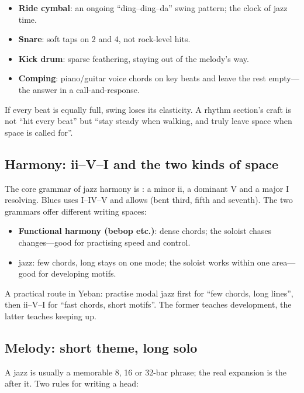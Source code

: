 \begin{itemize}
\item \textbf{Ride cymbal}: an ongoing ``ding--ding--da'' swing pattern; the clock of jazz time.
\item \textbf{Snare}: soft taps on 2 and 4, not rock-level hits.
\item \textbf{Kick drum}: sparse feathering, staying out of the melody's way.
\item \textbf{Comping}: piano/guitar voice chords on key beats and leave the rest empty---the answer in a call-and-response.
\end{itemize}

If every beat is equally full, swing loses its elasticity. A rhythm section's craft is not ``hit every beat'' but ``stay steady when walking, and truly leave space when space is called for''.

\subsection{Harmony: ii--V--I and the two kinds of space}
\label{sec:jazz-harmony}

The core grammar of jazz harmony is : a minor ii, a dominant V and a major I resolving. Blues uses I--IV--V and allows  (bent third, fifth and seventh). The two grammars offer different writing spaces:

\begin{itemize}
\item \textbf{Functional harmony (bebop etc.)}: dense chords; the soloist chases changes---good for practising speed and control.
\item {} jazz: few chords, long stays on one mode; the soloist works within one area---good for developing motifs.
\end{itemize}

A practical route in Yeban: practise modal jazz first for ``few chords, long lines'', then ii--V--I for ``fast chords, short motifs''. The former teaches development, the latter teaches keeping up.

\subsection{Melody: short theme, long solo}
\label{sec:jazz-melody}

A jazz  is usually a memorable 8, 16 or 32-bar phrase; the real expansion is the  after it. Two rules for writing a head:

